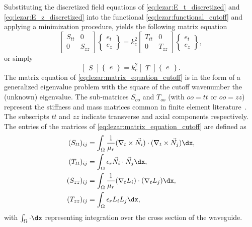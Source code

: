 Substituting the discretized field equations
of \eqref{eq:lezar:E_t_discretized}
and \eqref{eq:lezar:E_z_discretized} into the
functional \eqref{eq:lezar:functional_cutoff} and applying a
minimization procedure, yields the following matrix
equation~\citep{Davidson2011}
\begin{equation}
    \label{eq:lezar:matrix_equation_cutoff}
    \begin{bmatrix} S_{tt} & 0\\0 & S_{zz}\end{bmatrix} \begin{Bmatrix}e_t\\e_z\end{Bmatrix} = k_c^2 \begin{bmatrix}T_{tt} & 0\\0 &   T_{zz}\end{bmatrix}\begin{Bmatrix}e_t\\e_z\end{Bmatrix},
\end{equation}
or simply
\begin{equation}
  \begin{bmatrix}S\end{bmatrix}\begin{Bmatrix}e\end{Bmatrix} = k_c^2 \begin{bmatrix}T\end{bmatrix}\begin{Bmatrix}e\end{Bmatrix}.
\end{equation}
The matrix equation of \eqref{eq:lezar:matrix_equation_cutoff} is in
the form of a generalized eigenvalue problem with the square of the
cutoff wavenumber the (unknown) eigenvalue. The sub-matrices $S_{oo}$
and $T_{oo}$ (with $oo = tt$ or $oo = zz$) represent the stiffness and
mass matrices common in finite element literature~\citep{Davidson2011,
Jin2002}. The subscripts $tt$ and $zz$ indicate transverse and axial
components respectively. The entries of the matrices
of \eqref{eq:lezar:matrix_equation_cutoff} are defined
as~\citep{PelosiCoccioliSelleri1998, Jin2002}
\begin{align}
\label{eq:lezar:S_tt_ij}
(S_{tt})_{ij} &= \int_\Omega \frac{1}{\mu_r}(\nabla_t\times\vec{N}_i)\cdot(\nabla_t\times\vec{N}_j) \dx,\\
\label{eq:lezar:T_tt_ij}
(T_{tt})_{ij} &= \int_\Omega \epsilon_r\vec{N}_i\cdot\vec{N}_j \dx,\\
\label{eq:lezar:S_zz_ij}
(S_{zz})_{ij} &= \int_\Omega \frac{1}{\mu_r}(\nabla_t L_i)\cdot(\nabla_t L_j) \dx,\\
\label{eq:lezar:T_zz_ij}
(T_{zz})_{ij} &= \int_\Omega \epsilon_r L_i L_j \dx,
\end{align}
with $\int_\Omega\cdot \dx$ representing integration over the cross section of the waveguide.

